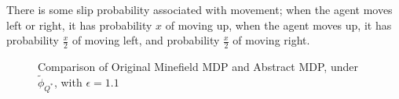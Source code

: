 \documentclass{article}
\newcommand{\ep}{\widetilde \phi}
\newcommand{\epQ}{\ep_{Q^*}}
\begin{document}
There is some slip probability associated with movement; when the agent moves left or right, it has probability $x$ of moving up, when the agent moves up, it has probability $\frac{x}{2}$ of moving left, and probability $\frac{x}{2}$ of moving right.

\begin{figure}
\label{fig:eps-states}
\caption{Comparison of Original Minefield MDP and Abstract MDP, under $\epQ$, with $\epsilon=1.1$}
\end{figure} 
\end{document}
